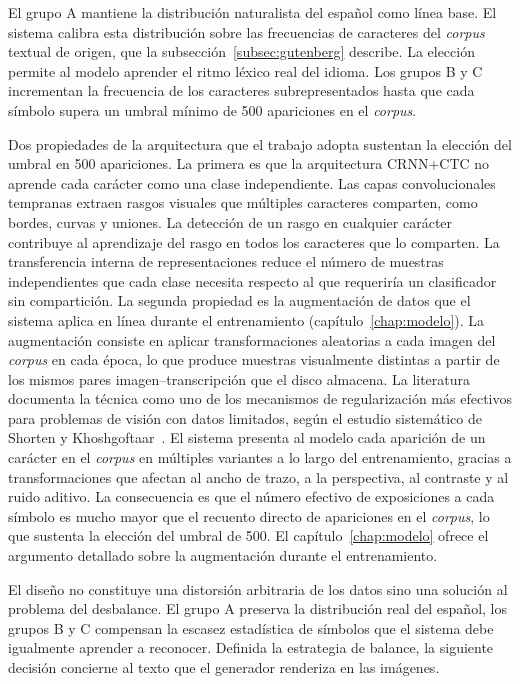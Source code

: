 El grupo A mantiene la distribución naturalista del español como línea base. El sistema calibra esta distribución sobre las frecuencias de caracteres del \textit{corpus} textual de origen, que la subsección~\ref{subsec:gutenberg} describe. La elección permite al modelo aprender el ritmo léxico real del idioma. Los grupos B y C incrementan la frecuencia de los caracteres subrepresentados hasta que cada símbolo supera un umbral mínimo de 500 apariciones en el \textit{corpus}.

Dos propiedades de la arquitectura que el trabajo adopta sustentan la elección del umbral en 500 apariciones. La primera es que la arquitectura CRNN+CTC no aprende cada carácter como una clase independiente. Las capas convolucionales tempranas extraen rasgos visuales que múltiples caracteres comparten, como bordes, curvas y uniones. La detección de un rasgo en cualquier carácter contribuye al aprendizaje del rasgo en todos los caracteres que lo comparten. La transferencia interna de representaciones reduce el número de muestras independientes que cada clase necesita respecto al que requeriría un clasificador sin compartición. La segunda propiedad es la augmentación de datos que el sistema aplica en línea durante el entrenamiento (capítulo~\ref{chap:modelo}). La augmentación consiste en aplicar transformaciones aleatorias a cada imagen del \textit{corpus} en cada época, lo que produce muestras visualmente distintas a partir de los mismos pares imagen--transcripción que el disco almacena. La literatura documenta la técnica como uno de los mecanismos de regularización más efectivos para problemas de visión con datos limitados, según el estudio sistemático de Shorten y Khoshgoftaar~\cite{shorten2019augmentation}. El sistema presenta al modelo cada aparición de un carácter en el \textit{corpus} en múltiples variantes a lo largo del entrenamiento, gracias a transformaciones que afectan al ancho de trazo, a la perspectiva, al contraste y al ruido aditivo. La consecuencia es que el número efectivo de exposiciones a cada símbolo es mucho mayor que el recuento directo de apariciones en el \textit{corpus}, lo que sustenta la elección del umbral de 500. El capítulo~\ref{chap:modelo} ofrece el argumento detallado sobre la augmentación durante el entrenamiento.

El diseño no constituye una distorsión arbitraria de los datos sino una solución al problema del desbalance. El grupo A preserva la distribución real del español, los grupos B y C compensan la escasez estadística de símbolos que el sistema debe igualmente aprender a reconocer. Definida la estrategia de balance, la siguiente decisión concierne al texto que el generador renderiza en las imágenes.

